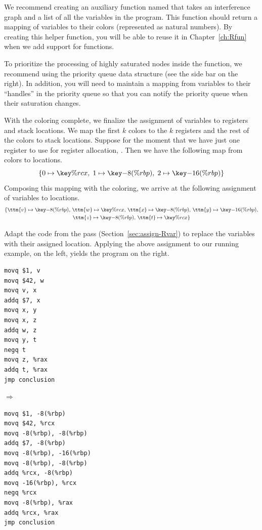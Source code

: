 \documentclass[11pt]{book}
\begin{document}
{We recommend creating an auxiliary function named 
that takes an interference graph and a list of all the variables in
the program. This function should return a mapping of variables to
their colors (represented as natural numbers). By creating this helper
function, you will be able to reuse it in Chapter~\ref{ch:Rfun}
when we add support for functions.

To prioritize the processing of highly saturated nodes inside the
 function, we recommend using the priority queue
data structure (see the side bar on the right). In addition, you will
need to maintain a mapping from variables to their ``handles'' in the
priority queue so that you can notify the priority queue when their
saturation changes.

With the coloring complete, we finalize the assignment of variables to
registers and stack locations. We map the first $k$ colors to the $k$
registers and the rest of the colors to stack locations.  Suppose for
the moment that we have just one register to use for register
allocation, . Then we have the following map from colors to
locations.
\[
  \{ 0 \mapsto \key{\%rcx}, \; 1 \mapsto \key{-8(\%rbp)}, \; 2 \mapsto \key{-16(\%rbp)} \}
\]
Composing this mapping with the coloring, we arrive at the following
assignment of variables to locations.
\begin{gather*}
  \{ \ttm{v} \mapsto \key{-8(\%rbp)}, \,
     \ttm{w} \mapsto \key{\%rcx},  \,
     \ttm{x} \mapsto \key{-8(\%rbp)}, \,
     \ttm{y} \mapsto \key{-16(\%rbp)}, \\
     \ttm{z} \mapsto \key{-8(\%rbp)}, \,
     \ttm{t} \mapsto \key{\%rcx} \}
\end{gather*}

Adapt the code from the  pass
(Section~\ref{sec:assign-Rvar}) to replace the variables with their
assigned location. Applying the above assignment to our running
example, on the left, yields the program on the right.
\begin{center}
  \begin{minipage}{0.3\textwidth}
\begin{lstlisting}
movq $1, v
movq $42, w
movq v, x
addq $7, x
movq x, y
movq x, z
addq w, z
movq y, t
negq t
movq z, %rax
addq t, %rax
jmp conclusion
\end{lstlisting}
\end{minipage}
$\Rightarrow\qquad$
\begin{minipage}{0.45\textwidth}
\begin{lstlisting}
movq $1, -8(%rbp)
movq $42, %rcx
movq -8(%rbp), -8(%rbp)
addq $7, -8(%rbp)
movq -8(%rbp), -16(%rbp)
movq -8(%rbp), -8(%rbp)
addq %rcx, -8(%rbp)
movq -16(%rbp), %rcx
negq %rcx
movq -8(%rbp), %rax
addq %rcx, %rax
jmp conclusion
\end{lstlisting}
\end{minipage}
\end{center}

}
\end{document}
